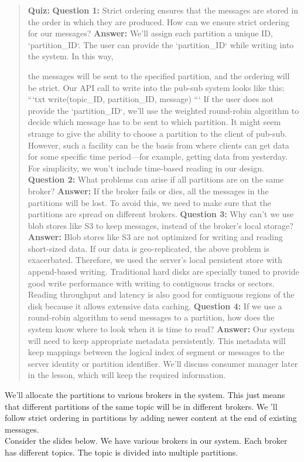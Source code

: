 \begin{quote}
\textbf{Quiz:}
\textbf{Question 1:} Strict ordering ensures that the messages are stored in the order in which they are produced. How can we ensure strict ordering for our messages?
\textbf{Answer:} We'll assign each partition a unique ID, `partition\_ID`. The user can provide the `partition\_ID` while writing into the system. In this way,

the messages will be sent to the specified partition, and the ordering will be strict. Our API call to write into the pub-sub system looks like this: ```txt write(topic\_ID, partition\_ID, message) ``` If the user does not provide the `partition\_ID`, we'll use the weighted round-robin algorithm to decide which message has to be sent to which partition. It might seem strange to give the ability to choose a partition to the client of pub-sub. However, such a facility can be the basis from where clients can get data for some specific time period---for example, getting data from yesterday. For simplicity, we won't include time-based reading in our design.
\textbf{Question 2:} What problems can arise if all partitions are on the same broker?
\textbf{Answer:} If the broker fails or dies, all the messages in the partitions will be lost. To avoid this, we need to make sure that the partitions are spread on different brokers.
\textbf{Question 3:} Why can't we use blob stores like S3 to keep messages, instead of the broker's local storage?
\textbf{Answer:} Blob stores like S3 are not optimized for writing and reading short-sized data. If our data is geo-replicated, the above problem is exacerbated. Therefore, we used the server's local persistent store with append-based writing. Traditional hard disks are specially tuned to provide good write performance with writing to contiguous tracks or sectors. Reading throughput and latency is also good for contiguous regions of the disk because it allows extensive data caching.
\textbf{Question 4:} If we use a round-robin algorithm to send messages to a partition, how does the system know where to look when it is time to read?
\textbf{Answer:} Our system will need to keep appropriate metadata persistently. This metadata will keep mappings between the logical index of segment or messages to the server identity or partition identifier. We'll discuss consumer manager later in the lesson, which will keep the required information.
\end{quote}

We'll allocate the partitions to various brokers in the system. This just means that different partitions of the same topic will be in different brokers. We 'll follow strict ordering in partitions by adding newer content at the end of existing messages.
\\
Consider the slides below. We have various brokers in our system. Each broker has different topics. The topic is divided into multiple partitions.

